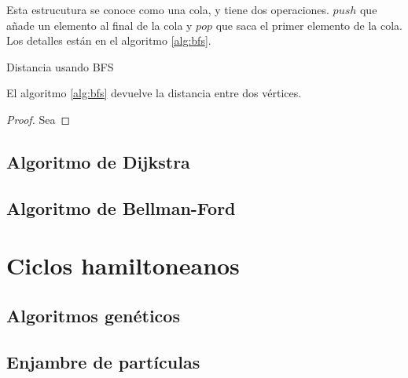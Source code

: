 Esta estrucutura se conoce como una cola, y tiene dos operaciones. $push$
que añade un elemento al final de la cola y $pop$ que saca el primer
elemento de la cola. Los detalles están en el algoritmo \ref{alg:bfs}.

\begin{algorithm}
  \caption{Distancia usando BFS}
  \label{alg:bfs}
  \begin{algorithmic}[1]
    \Statex
    \State {}
    \EndIf
    \Statex
    \EndIf
    \Statex
    \EndFor
    \EndWhile
    \Statex
    \State {}
  \end{algorithmic}
\end{algorithm}

\begin{proposition}
  El algoritmo \ref{alg:bfs} devuelve la distancia entre dos vértices.
\end{proposition}

\begin{proof}
  Sea
\end{proof}

\subsection{Algoritmo de Dijkstra}

\subsection{Algoritmo de Bellman-Ford}

\section{Ciclos hamiltoneanos}

\subsection{Algoritmos genéticos}

\subsection{Enjambre de partículas}

